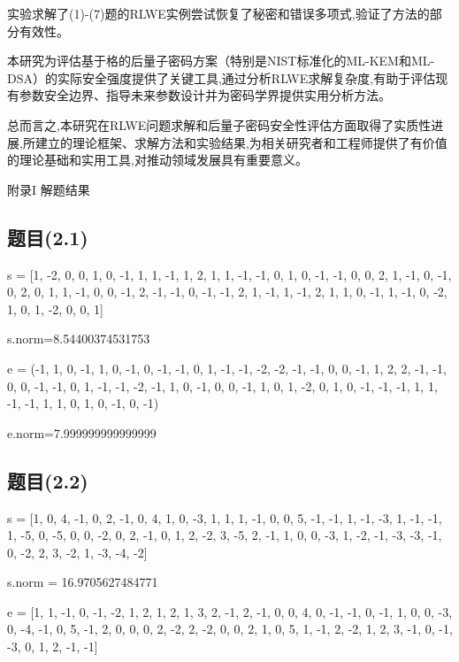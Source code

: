 \documentclass[12pt,a4paper]{article}
\numberwithin{equation}{section}
\begin{document}
实验求解了(1)-(7)题的RLWE实例尝试恢复了秘密和错误多项式,验证了方法的部分有效性。

本研究为评估基于格的后量子密码方案（特别是NIST标准化的ML-KEM和ML-DSA）的实际安全强度提供了关键工具,通过分析RLWE求解复杂度,有助于评估现有参数安全边界、指导未来参数设计并为密码学界提供实用分析方法。


总而言之,本研究在RLWE问题求解和后量子密码安全性评估方面取得了实质性进展,所建立的理论框架、求解方法和实验结果,为相关研究者和工程师提供了有价值的理论基础和实用工具,对推动领域发展具有重要意义。

\hspace*{\fill}

{\centering\heiti\fontsize{14pt}{21pt}\selectfont 附录I \; 解题结果\par}
\vspace{1em}

\subsection{题目(2.1)}

s = [1, -2, 0, 0, 1, 0, -1, 1, 1, -1, 1, 2, 1, 1,
-1, -1, 0, 1, 0, -1, -1, 0, 0, 2, 1, -1, 0, -1, 0, 2, 0, 1,
1, -1, 0, 0, -1, 2, -1, -1, 0, -1, -1, 2, 1, -1, 1, -1, 2, 1, 1, 0,
-1, 1, -1, 0, -2, 1, 0, 1, -2, 0, 0, 1]

s.norm=8.54400374531753

e = (-1, 1, 0, -1, 1, 0, -1, 0, -1, -1, 0, 1, -1, -1, -2, -2, -1, -1, 0, 0, -1, 1, 2, 2, -1,
-1, 0, 0, -1, -1, 0, 1, -1, -1, -2, -1, 1, 0, -1, 0, 0, -1, 1, 0, 1, -2, 0, 1, 0, -1, -1,
-1, 1, 1, -1, -1, 1, 1, 0, 1, 0, -1, 0, -1)

e.norm=7.999999999999999

\subsection{题目(2.2)}

s = [1, 0, 4, -1, 0, 2, -1, 0, 4, 1, 0, -3, 1, 1, 1, -1, 0, 0, 5, -1, -1, 1, -1, -3, 1, -1, -1, 1, -5, 0, -5, 0, 0, -2, 0, 2, -1, 0, 1, 2, -2, 3, -5, 2, -1, 1, 0, 0, -3, 1, -2, -1, -3, -3, -1, 0, -2, 2, 3, -2, 1, -3, -4, -2]

s.norm = 16.9705627484771

e = [1, 1, -1, 0, -1, -2, 1, 2, 1, 2, 1, 3, 2, -1, 2, -1, 0, 0, 4, 0, -1, -1, 0, -1, 1, 0, 0, -3, 0, -4, -1, 0, 5, -1, 2, 0, 0, 0, 2, -2, 2, -2, 0, 0, 2, 1, 0, 5, 1, -1, 2, -2, 1, 2, 3, -1, 0, -1, -3, 0, 1, 2, -1, -1]
\end{document}
